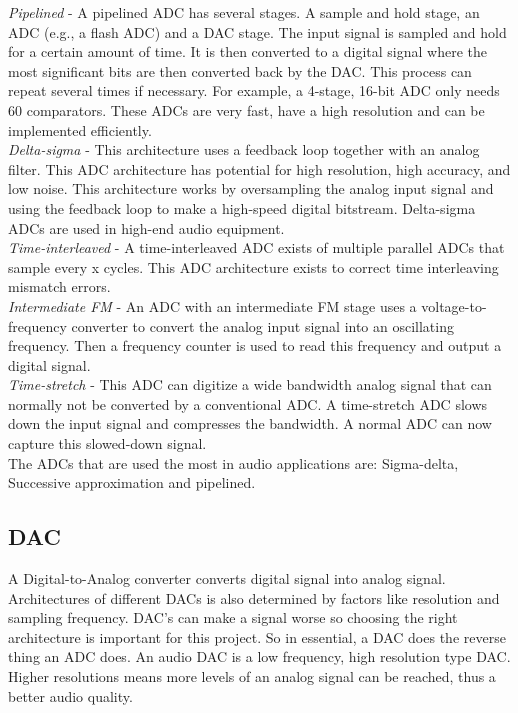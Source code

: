         \textit{Pipelined} - A pipelined ADC has several stages. A sample and hold stage, an ADC (e.g., a flash ADC) and a DAC stage. The input signal is sampled and hold for a certain amount of time. It is then converted to a digital signal where the most significant bits are then converted back by the DAC. This process can repeat several times if necessary. For example, a 4-stage, 16-bit ADC only needs 60 comparators. 
        These ADCs are very fast, have a high resolution and can be implemented efficiently. \\
        
        \textit{Delta-sigma} - This architecture uses a feedback loop together with an analog filter. This ADC architecture has potential for high resolution, high accuracy, and low noise. This architecture works by oversampling the analog input signal and using the feedback loop to make a high-speed digital bitstream. Delta-sigma ADCs are used in high-end audio equipment. \\

        \textit{Time-interleaved} - A time-interleaved ADC exists of multiple parallel ADCs that sample every x cycles. This ADC architecture exists to correct time interleaving mismatch errors.\\

        \textit{Intermediate FM} - An ADC with an intermediate FM stage uses a voltage-to-frequency converter to convert the analog input signal into an oscillating frequency. Then a frequency counter is used to read this frequency and output a digital signal.\\

        \textit{Time-stretch} - This ADC can digitize a wide bandwidth analog signal that can normally not be converted by a conventional ADC. A time-stretch ADC slows down the input signal and compresses the bandwidth. A normal ADC can now capture this slowed-down signal.\\
        
        The ADCs that are used the most in audio applications are: Sigma-delta, Successive approximation and pipelined.\\

        \subsection{DAC}
        A Digital-to-Analog converter converts digital signal into analog signal. Architectures of different DACs is also determined by factors like resolution and sampling frequency. DAC’s can make a signal worse so choosing the right architecture is important for this project. So in essential, a DAC does the reverse thing an ADC does.
An audio DAC is a low frequency, high resolution type DAC. Higher resolutions means more levels of an analog signal can be reached, thus a better audio quality. \\

